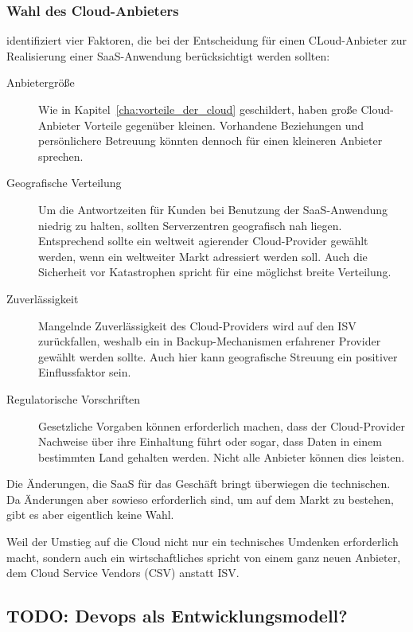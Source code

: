 \subsubsection{Wahl des Cloud-Anbieters}
 identifiziert vier Faktoren, die
bei der Entscheidung für einen CLoud-Anbieter zur Realisierung einer
SaaS-Anwendung berücksichtigt werden sollten:
\begin{description}
	\item[Anbietergröße] Wie in Kapitel~\ref{cha:vorteile_der_cloud}
geschildert, haben große Cloud-Anbieter Vorteile gegenüber kleinen. Vorhandene
Beziehungen und persönlichere Betreuung könnten dennoch für einen kleineren
Anbieter sprechen.
	\item[Geografische Verteilung] Um die Antwortzeiten für Kunden bei
Benutzung der SaaS-Anwendung niedrig zu halten, sollten Serverzentren
geografisch nah liegen. Entsprechend sollte ein weltweit agierender
Cloud-Provider gewählt werden, wenn ein weltweiter Markt adressiert werden
soll. Auch die Sicherheit vor Katastrophen spricht für eine möglichst breite
Verteilung.
	\item[Zuverlässigkeit] Mangelnde Zuverlässigkeit des Cloud-Providers
wird auf den ISV zurückfallen, weshalb ein in Backup-Mechanismen erfahrener
Provider gewählt werden sollte. Auch hier kann geografische Streuung ein
positiver Einflussfaktor sein.
	\item[Regulatorische Vorschriften] Gesetzliche Vorgaben können
erforderlich machen, dass der Cloud-Provider Nachweise über ihre Einhaltung
führt oder sogar, dass Daten in einem bestimmten Land gehalten werden. Nicht
alle Anbieter können dies leisten.
\end{description}


Die Änderungen, die SaaS für das Geschäft bringt überwiegen die
technischen. Da Änderungen aber
sowieso erforderlich sind, um auf
dem Markt zu bestehen, gibt es aber
eigentlich keine Wahl. 

Weil der Umstieg auf die Cloud nicht nur ein technisches Umdenken erforderlich
macht, sondern auch ein wirtschaftliches spricht
 von einem ganz neuen Anbieter, dem
Cloud Service Vendors (CSV) anstatt ISV.

\subsection{TODO: Devops als Entwicklungsmodell?}

